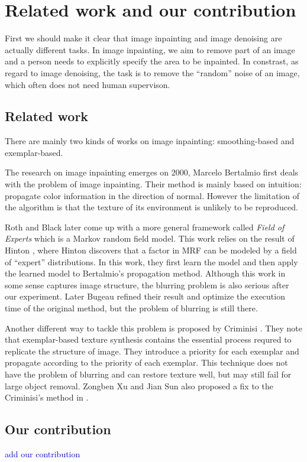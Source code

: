 \section{Related work and our contribution}
First we should make it clear that image inpainting and image denoising are
actually different tasks. In image inpainting, we aim to remove part of 
an image and a person needs to explicitly specify the area to be inpainted.
In constrast, as regard to image denoising, the task is to remove the 
``random'' noise of an image, which often does not need human supervison.
\subsection{Related work}
There are mainly two kinds of works on image inpainting: smoothing-based and
exemplar-based.

The research on image inpainting emerges on 2000, Marcelo Bertalmio \etal
\cite{siggraph00} first deals with the problem of image inpainting. Their
method is mainly based on intuition: propagate color information in the
direction of normal. However the limitation of the algorithm is that the
texture of its environment is unlikely to be reproduced.

Roth and Black \cite{cvpr05} later come up with a more general framework 
called \emph{Field of Experts} which is a Markov random field model. This
work relies on the result of Hinton \cite{neco02, nips02}, where Hinton discovers
that a factor in MRF can be modeled by a field of ``expert'' distributions.
In this work, they first learn the model and then apply the learned model
to Bertalmio's propagation method. Although this work in some sense captures
image structure, the blurring problem is also serious after our experiment. Later Bugeau\etal \cite{tip10} refined their result and optimize the execution time of the original method, but the problem of blurring is still there.

Another different way to tackle this problem is proposed by Criminisi \etal
 \cite{cvpr03,tip04}. They note that exemplar-based texture synthesis
 contains the essential process requred to replicate the structure of image.
 They introduce a priority for each exemplar and propagate according to
 the priority of each exemplar. This technique does not have the problem
 of blurring and can restore texture well, but may still fail for large
 object removal. Zongben Xu and Jian Sun also proposed a fix to the Criminisi's method in \cite{tip10sj}.

\subsection{Our contribution}
\textcolor{blue}{add our contribution}
